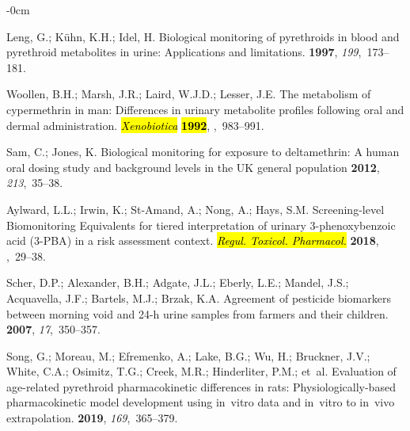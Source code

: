 \documentclass[toxics,article,accept,pdftex,moreauthors]{Definitions/mdpi}
\begin{document}
\begin{adjustwidth}{-\extralength}{0cm}
\begin{thebibliography}{999}
Leng, G.; K{\"u}hn, K.H.; Idel, H.
\newblock Biological monitoring of pyrethroids in blood and pyrethroid
  metabolites in urine: Applications and limitations.
 {\bf 1997}, {\em
  199},~173--181.

Woollen, B.H.; Marsh, J.R.; Laird, W.J.D.; Lesser, J.E.
\newblock The metabolism of cypermethrin in man: Differences in urinary
  metabolite profiles following oral and dermal administration. \emph{\hl{Xenobiotica} %
} \textbf{\hl{1992}},
,~983--991.

 Sam, C.; Jones, K.
\newblock Biological monitoring for exposure to deltamethrin: A human oral dosing 
study and background levels in the UK general population 
 {\bf 2012}, {\em 213},~35--38.

Aylward, L.L.; Irwin, K.; St-Amand, A.; Nong, A.; Hays, S.M.
\newblock Screening-level Biomonitoring Equivalents for tiered interpretation
  of urinary 3-phenoxybenzoic acid (3-{PBA}) in a risk assessment context. \emph{\hl{Regul. Toxicol. Pharmacol.} %
}  \textbf{2018},
,~29--38.

Scher, D.P.; Alexander, B.H.; Adgate, J.L.; Eberly, L.E.; Mandel, J.S.;
  Acquavella, J.F.; Bartels, M.J.; Brzak, K.A.
\newblock Agreement of pesticide biomarkers between morning void and 24-h urine
  samples from farmers and their children.
 {\bf
  2007}, {\em 17},~350--357.

Song, G.; Moreau, M.; Efremenko, A.; Lake, B.G.; Wu, H.; Bruckner, J.V.; White,
  C.A.; Osimitz, T.G.; Creek, M.R.; Hinderliter, P.M.;  et~al.
\newblock Evaluation of age-related pyrethroid pharmacokinetic differences in
  rats: Physiologically-based pharmacokinetic model development using in~vitro
  data and in~vitro to in~vivo extrapolation.
 {\bf 2019}, {\em 169},~365--379.


\end{thebibliography}
\end{adjustwidth}
\end{document}
